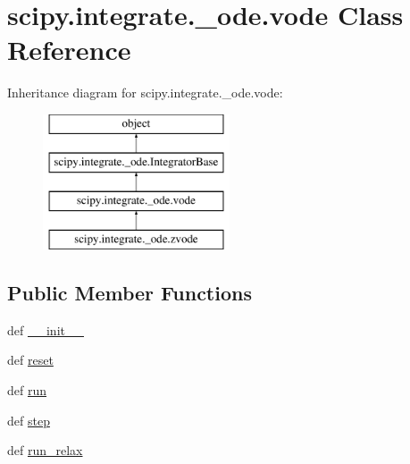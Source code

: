 \hypertarget{classscipy_1_1integrate_1_1__ode_1_1vode}{}\section{scipy.\+integrate.\+\_\+ode.\+vode Class Reference}
\label{classscipy_1_1integrate_1_1__ode_1_1vode}
Inheritance diagram for scipy.\+integrate.\+\_\+ode.\+vode\+:\begin{figure}[H]
\begin{center}
\leavevmode
\includegraphics[height=4.000000cm]{classscipy_1_1integrate_1_1__ode_1_1vode}
\end{center}
\end{figure}
\subsection*{Public Member Functions}
\begin{DoxyCompactItemize}
\item 
def \hyperlink{classscipy_1_1integrate_1_1__ode_1_1vode_a4e3ab1e36b750e24821ff30a2b58d5ac}{\+\_\+\+\_\+init\+\_\+\+\_\+}
\item 
def \hyperlink{classscipy_1_1integrate_1_1__ode_1_1vode_abf105663bb3d5bbc0c4ecb54297ec15c}{reset}
\item 
def \hyperlink{classscipy_1_1integrate_1_1__ode_1_1vode_a3e2e10f02586430d0444f423fb7a8d6f}{run}
\item 
def \hyperlink{classscipy_1_1integrate_1_1__ode_1_1vode_aa10b753eb18407579404ad9ff7808ba5}{step}
\item 
def \hyperlink{classscipy_1_1integrate_1_1__ode_1_1vode_ae14ec14ad3e21c27f398caa102cc8cee}{run\+\_\+relax}
\end{DoxyCompactItemize}
